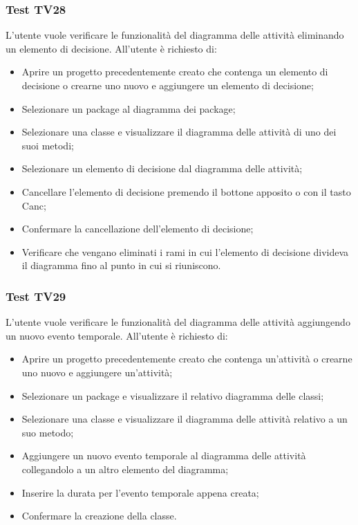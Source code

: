 \documentclass[../PianoDiQualifica.tex]{subfiles}
\begin{document}
	
	\subsubsection{Test TV28} 
	L'utente vuole verificare le funzionalità del diagramma delle attività eliminando un elemento di decisione. 
	All'utente è richiesto di: 
	\begin{itemize} 
		\item Aprire un progetto precedentemente creato che contenga un elemento di decisione o crearne uno nuovo e aggiungere un elemento di decisione;
		\item Selezionare un package al diagramma dei package; 
		\item Selezionare una classe e visualizzare il diagramma delle attività di uno dei suoi metodi; 
		\item Selezionare un elemento di decisione dal diagramma delle attività; 
		\item Cancellare l'elemento di decisione premendo il bottone apposito o con il tasto Canc; 
		\item Confermare la cancellazione dell'elemento di decisione;%
		\item Verificare che vengano eliminati i rami in cui l'elemento di decisione divideva il diagramma fino al punto in cui si riuniscono.
	\end{itemize} 	
	
	\subsubsection{Test TV29} 
	L'utente vuole verificare le funzionalità del diagramma delle attività aggiungendo un nuovo evento temporale. 
	All'utente è richiesto di: 
	\begin{itemize} 
		\item Aprire un progetto precedentemente creato che contenga un'attività o crearne uno nuovo e aggiungere un'attività;
		\item Selezionare un package e visualizzare il relativo diagramma delle classi; 
		\item Selezionare una classe e visualizzare il diagramma delle attività relativo a un suo metodo; %
		\item Aggiungere un nuovo evento temporale al diagramma delle attività collegandolo a un altro elemento del diagramma; 
		\item Inserire la durata per l'evento temporale appena creata; %
		\item Confermare la creazione della classe. 
	\end{itemize} 
	
\end{document}

